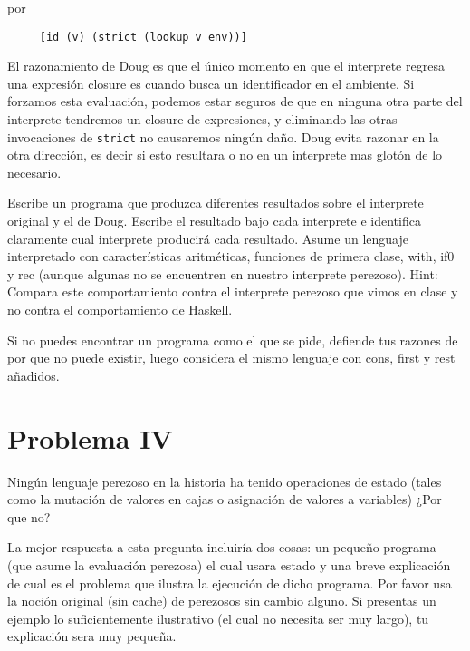 \documentclass{article}
\begin{document}
por

\begin{verbatim}
     [id (v) (strict (lookup v env))]
\end{verbatim}

El razonamiento de Doug es que el único momento en que el interprete regresa una
expresión closure es cuando busca un identificador en el ambiente. Si forzamos
esta evaluación, podemos estar seguros de que en ninguna otra parte del interprete
tendremos un closure de expresiones, y eliminando las otras invocaciones de
\texttt{strict} no causaremos ningún daño. Doug evita razonar en la otra dirección,
es decir si esto resultara o no en un interprete mas glotón de lo necesario.

Escribe un programa que produzca diferentes resultados sobre el interprete original
y el de Doug. Escribe el resultado bajo cada interprete e identifica claramente
cual interprete producirá cada resultado. Asume un lenguaje interpretado
con características aritméticas, funciones de primera clase, with, if0 y rec
(aunque algunas no se encuentren en nuestro interprete perezoso). Hint: Compara
este comportamiento contra el interprete perezoso que vimos en clase y no contra
el comportamiento de Haskell.

Si no puedes encontrar un programa como el que se pide, defiende tus razones
de por que no puede existir, luego considera el mismo lenguaje con cons, first
y rest añadidos.

\section*{Problema IV}
Ningún lenguaje perezoso en la historia ha tenido operaciones de estado (tales
como la mutación de valores en cajas o asignación de valores a variables) ¿Por
que no?

La mejor respuesta a esta pregunta incluiría dos cosas: un pequeño programa (que
asume la evaluación perezosa) el cual usara estado y una breve explicación de cual
es el problema que ilustra la ejecución de dicho programa. Por favor usa la
noción original (sin cache) de perezosos sin cambio alguno. Si presentas un
ejemplo lo suficientemente ilustrativo (el cual no necesita ser muy largo), tu
explicación sera muy pequeña.
\end{document}
